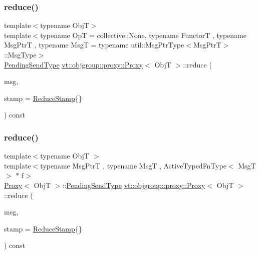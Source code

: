 \subsubsection{\texorpdfstring{reduce()}{reduce()}\hspace{0.1cm}{\footnotesize\ttfamily [4/5]}}
{\footnotesize\ttfamily template$<$typename ObjT$>$ \\
template$<$typename OpT  = collective\+::\+None, typename FunctorT , typename Msg\+PtrT , typename MsgT  = typename util\+::\+Msg\+Ptr\+Type$<$\+Msg\+Ptr\+T$>$\+::\+Msg\+Type$>$ \\
\hyperlink{structvt_1_1objgroup_1_1proxy_1_1_proxy_a1bdf8713203531d306702a024872bb08}{Pending\+Send\+Type} \hyperlink{structvt_1_1objgroup_1_1proxy_1_1_proxy}{vt\+::objgroup\+::proxy\+::\+Proxy}$<$ ObjT $>$\+::reduce (\begin{DoxyParamCaption}\item[{Msg\+PtrT}]{msg,  }\item[{\hyperlink{structvt_1_1objgroup_1_1proxy_1_1_proxy_a337be4c20cf11ff6477c7a66208cc909}{Reduce\+Stamp}}]{stamp = {\ttfamily \hyperlink{structvt_1_1objgroup_1_1proxy_1_1_proxy_a337be4c20cf11ff6477c7a66208cc909}{Reduce\+Stamp}\{\}} }\end{DoxyParamCaption}) const\hspace{0.3cm}{\ttfamily [inline]}}

\mbox{\label{structvt_1_1objgroup_1_1proxy_1_1_proxy_ad481da6a8dff55801daa9250420bae9c}} 
\subsubsection{\texorpdfstring{reduce()}{reduce()}\hspace{0.1cm}{\footnotesize\ttfamily [5/5]}}
{\footnotesize\ttfamily template$<$typename ObjT $>$ \\
template$<$typename Msg\+PtrT , typename MsgT , Active\+Typed\+Fn\+Type$<$ Msg\+T $>$ $\ast$ f$>$ \\
\hyperlink{structvt_1_1objgroup_1_1proxy_1_1_proxy}{Proxy}$<$ ObjT $>$\+::\hyperlink{structvt_1_1objgroup_1_1proxy_1_1_proxy_a1bdf8713203531d306702a024872bb08}{Pending\+Send\+Type} \hyperlink{structvt_1_1objgroup_1_1proxy_1_1_proxy}{vt\+::objgroup\+::proxy\+::\+Proxy}$<$ ObjT $>$\+::reduce (\begin{DoxyParamCaption}\item[{Msg\+PtrT}]{msg,  }\item[{\hyperlink{structvt_1_1objgroup_1_1proxy_1_1_proxy_a337be4c20cf11ff6477c7a66208cc909}{Reduce\+Stamp}}]{stamp = {\ttfamily \hyperlink{structvt_1_1objgroup_1_1proxy_1_1_proxy_a337be4c20cf11ff6477c7a66208cc909}{Reduce\+Stamp}\{\}} }\end{DoxyParamCaption}) const}



